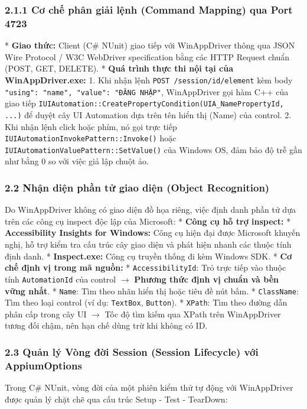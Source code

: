 \subsubsection{2.1.1 Cơ chế phân giải lệnh (Command Mapping) qua Port 4723}
* \textbf{Giao thức:} Client (C# NUnit) giao tiếp với WinAppDriver thông qua JSON Wire Protocol / W3C WebDriver specification bằng các HTTP Request chuẩn (POST, GET, DELETE).
* \textbf{Quá trình thực thi nội tại của WinAppDriver.exe:}
  1. Khi nhận lệnh \texttt{POST /session/{id}/element} kèm body \texttt{{"using": "name", "value": "ĐĂNG NHẬP"}}, WinAppDriver gọi hàm C++ của giao tiếp \texttt{IUIAutomation::CreatePropertyCondition(UIA_NamePropertyId, ...)} để duyệt cây UI Automation dựa trên tên hiển thị (Name) của control.
  2. Khi nhận lệnh click hoặc phím, nó gọi trực tiếp \texttt{IUIAutomationInvokePattern::Invoke()} hoặc \texttt{IUIAutomationValuePattern::SetValue()} của Windows OS, đảm bảo độ trễ gần như bằng 0 so với việc giả lập chuột ảo.

\subsubsection{2.2 Nhận diện phần tử giao diện (Object Recognition)}
Do WinAppDriver không có giao diện đồ họa riêng, việc định danh phần tử dựa trên các công cụ inspect độc lập của Microsoft:
* \textbf{Công cụ hỗ trợ inspect:}
  * \textbf{Accessibility Insights for Windows:} Công cụ hiện đại được Microsoft khuyến nghị, hỗ trợ kiểm tra cấu trúc cây giao diện và phát hiện nhanh các thuộc tính định danh.
  * \textbf{Inspect.exe:} Công cụ truyền thống đi kèm Windows SDK.
* \textbf{Cơ chế định vị trong mã nguồn:}
  * \texttt{AccessibilityId}: Trỏ trực tiếp vào thuộc tính \texttt{AutomationId} của control $\rightarrow$ \textbf{Phương thức định vị chuẩn và bền vững nhất}.
  * \texttt{Name}: Tìm theo nhãn hiển thị hoặc tiêu đề nút bấm.
  * \texttt{ClassName}: Tìm theo loại control (ví dụ: \texttt{TextBox}, \texttt{Button}).
  * \texttt{XPath}: Tìm theo đường dẫn phân cấp trong cây UI $\rightarrow$ Tốc độ tìm kiếm qua XPath trên WinAppDriver tương đối chậm, nên hạn chế dùng trừ khi không có ID.


\subsubsection{2.3 Quản lý Vòng đời Session (Session Lifecycle) với AppiumOptions}

Trong C# NUnit, vòng đời của một phiên kiểm thử tự động với WinAppDriver được quản lý chặt chẽ qua cấu trúc Setup - Test - TearDown:

